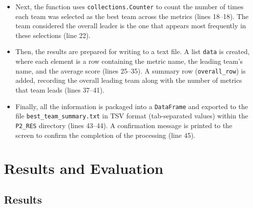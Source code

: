 \documentclass[12pt]{report}
\begin{document}
{{\begin{itemize}
    \item Next, the function uses \texttt{collections.Counter} to count the number of times each team was selected as the best team across the metrics (lines 18--18). The team considered the overall leader is the one that appears most frequently in these selections (line 22).

    \item Then, the results are prepared for writing to a text file. A list \texttt{data} is created, where each element is a row containing the metric name, the leading team's name, and the average score (lines 25--35). A summary row (\texttt{overall\_row}) is added, recording the overall leading team along with the number of metrics that team leads (lines 37--41).
\item Finally, all the information is packaged into a \texttt{DataFrame} and exported to the file \texttt{best\_team\_summary.txt} in TSV format (tab-separated values) within the \texttt{P2\_RES} directory (lines 43--44). A confirmation message is printed to the screen to confirm the completion of the processing (line 45).
\end{itemize}
\section{Results and Evaluation} %
\subsection{Results} %
}}
\end{document}
